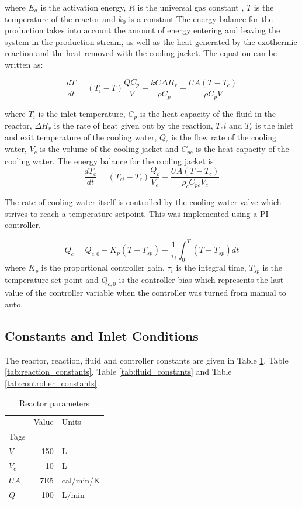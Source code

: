 \documentclass{article}
\begin{document}
where $E_a$ is the activation energy, $R$ is the universal gas constant , $T$ is the temperature of the reactor and $k_0$ is a constant.The energy balance for the production takes into account the amount of energy entering and leaving the system in the production stream, as well as the heat generated by the exothermic reaction and the heat removed with the cooling jacket. The equation can be written as:

\begin{equation}
	\frac{dT}{dt} = (T_i-T)\frac{Q C_p}{V}+\frac{kC\Delta H_{r}}{\rho C_p}-\frac{UA(T-T_c)}{\rho C_p V}
\end{equation}

where $T_i$ is the inlet temperature, $C_p$ is the heat capacity of the fluid in the reactor, $\Delta H_r$ is the rate of heat given out by the reaction, $T_ci$ and $T_c$ is the inlet and exit temperature of the cooling water, $Q_c$ is the flow rate of the cooling water, $V_c$ is the volume of the cooling jacket and $C_{pc}$ is the heat capacity of the cooling water. The energy balance for the cooling jacket is 
\begin{equation}
	\frac{dT_c}{dt} = (T_{ci}-T_{c})\frac{Q_c}{V_c} +\frac{UA(T-T_c)}{\rho_c C_{pc} V_c	} 
\end{equation}

The rate of cooling water itself is controlled by the cooling water valve which strives to reach a temperature setpoint. This was implemented using a PI controller. 

\begin{equation}
	Q_c = Q_{c, 0} + K_p(T-T_{sp}) + \frac{1}{\tau_i}\int_{0}^{T}(T-T_{sp})dt 
\end{equation}
where $K_p$ is the proportional controller gain, $\tau_i$ is the integral time, $T_{sp}$ is the temperature set point and $Q_{c, 0}$ is the controller bias which represents the last value of the controller variable when the controller was turned from manual to auto.

\subsection{Constants and Inlet Conditions}
\label{sec:parameters}

The reactor, reaction, fluid and controller constants are given in Table \ref{tab:reactor_conditions}, Table \ref{tab:reaction_constants}, Table \ref{tab:fluid_constants} and Table \ref{tab:controller_constants}.

\begin{table}[h]
	\caption{Reactor parameters}
	\label{tab:reactor_conditions}
	\centering
	\begin{tabular}{lrl}
		\toprule
		{} &  Value &  Units \\
		Tags &        &        \\
		\midrule
		$V$  &      150 &  L \\
		$V_c$  &    10 &      L \\
		$UA$  &    7E5 &      cal/min/K \\
		$Q$  &    100	 &      L/min\\
		\bottomrule
	\end{tabular}
\end{table}
\end{document}
